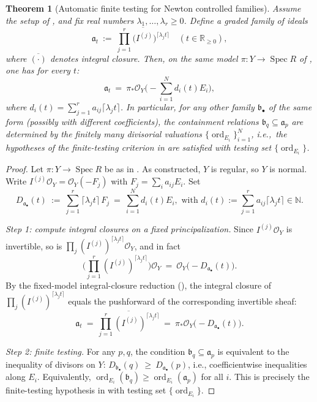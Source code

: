 \documentclass[12pt]{amsart}
\newcommand{\NN}{\mathbb{N}}
\newcommand{\RR}{\mathbb{R}}
\newcommand{\ord}{\operatorname{\mathrm{ord}}}
\renewcommand{\a}{\mathfrak{a}}
\renewcommand{\b}{\mathfrak{b}}
\newcommand{\cO}{\mathcal{O}}
\DeclareMathOperator{\Spec}{Spec}
\newcommand{\abul}{{\a_\bullet}}
\newcommand{\bbul}{{\b_\bullet}}
\theoremstyle{plain}
\newtheorem{theorem}{Theorem}[section]
\theoremstyle{definition}
\numberwithin{equation}{section}
\begin{document}
\begin{theorem}[Automatic finite testing for Newton controlled families]\label{thm:automatic-finite-testing-newton}
	Assume the setup of , and fix real numbers
	$\lambda_1,\dots,\lambda_r\ge 0$.  Define a graded family of ideals
	\[
	\a_t\ :=\ \overline{\prod_{j=1}^r \big(I^{(j)}\big)^{\lceil \lambda_j t\rceil}}
	\quad (t\in\RR_{\ge 0}),
	\]
	where $\overline{(\cdot)}$ denotes integral closure.
	Then, on the same model $\pi:Y\to\Spec R$ of ,
	one has for every $t$:
	\[
	\a_t\ =\ \pi_*\cO_Y\Big(-\sum_{i=1}^N d_i(t)E_i\Big),
	\]
	where $d_i(t) = \sum_{j=1}^r a_{ij} \lceil \lambda_j t\rceil$.
	In particular, for any other family $\bbul$ of the same form (possibly with different coefficients),
	the containment relations $\b_q\subseteq \a_p$ are determined by the finitely many divisorial valuations
	$\{\ord_{E_i}\}_{i=1}^N$, i.e.,\ the hypotheses of the finite-testing criterion
	in  are satisfied with testing set $\{\ord_{E_i}\}$.
\end{theorem}

\begin{proof}
	Let $\pi:Y\to \Spec R$ be as in . As constructed, $Y$ is regular, so $Y$ is normal. Write
	\(
	I^{(j)}\cO_Y=\cO_Y(-F_j)
	\)
	with
	\(F_j=\sum_i a_{ij}E_i\).
	Set
	\[
	D_\abul(t)\ :=\ \sum_{j=1}^r \lceil \lambda_j t\rceil\,F_j\ =\ \sum_{i=1}^N d_i(t)E_i, \text{ with } 
	d_i(t):=\sum_{j=1}^r a_{ij} \lceil \lambda_j t\rceil \in\NN.
	\]
	
	\smallskip\noindent
	\emph{Step 1: compute integral closures on a fixed principalization.}
	Since $I^{(j)}\cO_Y$ is invertible, so is $\prod_j (I^{(j)})^{\lceil \lambda_j t\rceil}\cO_Y$,
	and in fact
	\[
	\Big(\prod_{j=1}^r (I^{(j)})^{\lceil \lambda_j t\rceil}\Big)\cO_Y\ =\ \cO_Y\big(-D_\abul(t)\big).
	\]
	By the fixed-model integral-closure reduction (),
	the integral closure of $\prod_j (I^{(j)})^{\lceil \lambda_j t\rceil}$ equals the pushforward
	of the corresponding invertible sheaf:
	\[
	\a_t\ =\ \overline{\prod_{j=1}^r (I^{(j)})^{\lceil \lambda_j t\rceil}}
	\ =\ \pi_*\cO_Y\big(-D_\abul(t)\big).
	\]
	
	\smallskip\noindent
	\emph{Step 2: finite testing.}
	For any $p,q$, the condition $\b_q\subseteq\a_p$ is equivalent to the inequality of divisors
	on $Y$:
	\(
	D_\bbul(q)\ \ge\ D_\abul(p)
	\),
	i.e.,  coefficientwise inequalities along $E_i$.
	Equivalently,
	\(
	\ord_{E_i}(\b_q)\ge \ord_{E_i}(\a_p)
	\)
	for all $i$.
	This is precisely the finite-testing hypothesis in  with testing set
	$\{\ord_{E_i}\}$.
\end{proof}
\end{document}
